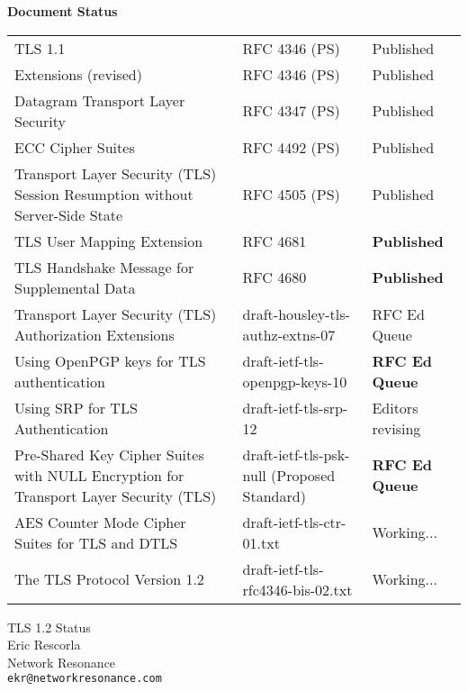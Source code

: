 \documentclass[fancybox]{seminar}
\newcommand{\heading}[1]{%
  \begin{center}
    \large\bf
    #1
  \end{center}
  \vspace{.4 in}}
\begin{document}
\begin{slide}
\heading{Document Status}

{\tiny
\begin{tabular}{|p{1.5 in}|p{1.4 in}|p{.7 in}|}
\hline
TLS 1.1 & RFC 4346 (PS) & Published \\
Extensions (revised) & RFC 4346 (PS) & Published \\
Datagram Transport Layer Security & RFC 4347 (PS) & Published \\
ECC Cipher Suites & RFC 4492 (PS) & Published \\
Transport Layer Security (TLS) Session Resumption without
Server-Side State & RFC 4505 (PS) & Published \\
TLS User Mapping Extension & RFC 4681 & \textbf{Published} \\
TLS Handshake Message for Supplemental Data & RFC 4680 & \textbf{Published} \\
Transport Layer Security (TLS) Authorization Extensions & draft-housley-tls-authz-extns-07 & RFC Ed Queue \\
Using OpenPGP keys for TLS authentication & draft-ietf-tls-openpgp-keys-10 & \textbf{RFC Ed Queue} \\
Using SRP for TLS Authentication & draft-ietf-tls-srp-12 & Editors revising \\
Pre-Shared Key Cipher Suites with NULL Encryption for Transport Layer Security (TLS) & draft-ietf-tls-psk-null (Proposed Standard) & \textbf{RFC Ed Queue} \\
AES Counter Mode Cipher Suites for TLS and DTLS & draft-ietf-tls-ctr-01.txt & Working... \\
The TLS Protocol Version 1.2 & draft-ietf-tls-rfc4346-bis-02.txt & Working... \\
\hline
\end{tabular}
}
\end{slide}

\begin{slide}
\begin{center}
\LARGE{{\bf}TLS 1.2 Status}\\

\vspace{.3 in}
\large{Eric Rescorla}\\
\large{Network Resonance}\\
\large{\texttt{ekr@networkresonance.com}}

\end{center}
\end{slide}
\end{document}
